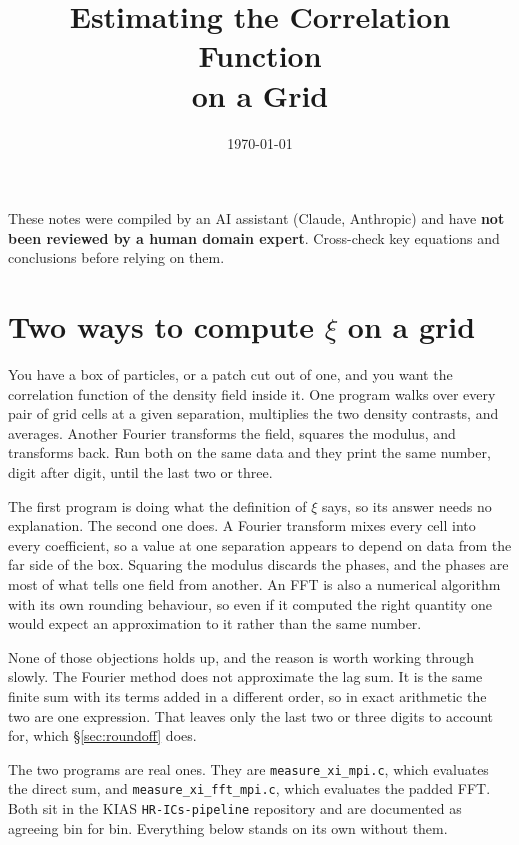 \documentclass[12pt]{article}
\title{Estimating the Correlation Function\\
       on a Grid}
\author{}
\date{\today}
\begin{document}
\maketitle

\begin{tcolorbox}[colback=yellow!10!white, colframe=orange!75!black,
                  title={\bfseries Disclaimer}]
These notes were compiled by an AI assistant (Claude, Anthropic) and have
\textbf{not been reviewed by a human domain expert}.  Cross-check key
equations and conclusions before relying on them.
\end{tcolorbox}

\tableofcontents

\section{Two ways to compute $\xi$ on a grid}\label{sec:question}

You have a box of particles, or a patch cut out of one, and you want the
correlation function of the density field inside it.  One program walks over
every pair of grid cells at a given separation, multiplies the two density
contrasts, and averages.  Another Fourier transforms the field, squares the
modulus, and transforms back.  Run both on the same data and they print the
same number, digit after digit, until the last two or three.

The first program is doing what the definition of $\xi$ says, so its answer
needs no explanation.  The second one does.  A Fourier transform mixes every
cell into every coefficient, so a value at one separation appears to depend on
data from the far side of the box.  Squaring the modulus discards the phases,
and the phases are most of what tells one field from another.  An FFT is also
a numerical algorithm with its own rounding behaviour, so even if it computed
the right quantity one would expect an approximation to it rather than the
same number.

None of those objections holds up, and the reason is worth working through
slowly.  The Fourier method does not approximate the lag sum.  It
is the same finite sum with its terms added in a different order, so in exact
arithmetic the two are one expression.  That leaves only the last two or three
digits to account for, which \S\ref{sec:roundoff} does.

The two programs are real ones.  They are
\texttt{measure\_xi\_mpi.c}, which evaluates the direct sum, and
\texttt{measure\_xi\_fft\_mpi.c}, which evaluates the padded FFT.  Both
sit in the KIAS \texttt{HR-ICs-pipeline} repository and are documented as
agreeing bin for bin.  Everything below stands on its own without them.
\end{document}
